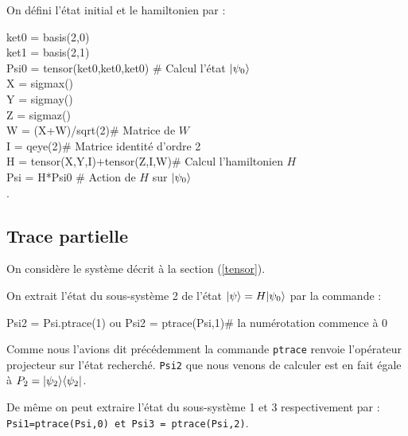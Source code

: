 On défini l'état initial et le hamiltonien par :\\
\begin{tt}
ket0 = basis(2,0)\\
ket1 = basis(2,1)\\
Psi0 = tensor(ket0,ket0,ket0) \# Calcul l'état $\vert\psi_0\rangle$\\
X = sigmax()\\
Y = sigmay()\\
Z = sigmaz()\\
W = (X+W)/sqrt(2)\# Matrice de $W$\\
I = qeye(2)\# Matrice identité d'ordre 2\\
H = tensor(X,Y,I)+tensor(Z,I,W)\# Calcul l'hamiltonien $H$\\
Psi = H*Psi0 \# Action de $H$ sur $\vert\psi_0\rangle$\\.
\end{tt}


\subsection{Trace partielle}

On considère le système décrit à la section (\ref{tensor}).

On extrait l'état du sous-système 2 de l'état $\vert\psi\rangle=H\vert\psi_0\rangle$ par la commande :\\
\begin{tt}
Psi2 = Psi.ptrace(1) ou Psi2 = ptrace(Psi,1)\# la numérotation commence à 0\\
\end{tt}
Comme nous l'avions dit précédemment la commande \texttt{ptrace} renvoie l'opérateur projecteur sur l'état recherché. \texttt{Psi2} que nous venons de calculer est en fait égale à $P_2=\vert\psi_2\rangle\langle\psi_2\vert$.

De même on peut extraire l'état du sous-système 1 et 3 respectivement par :\\ \texttt{Psi1=ptrace(Psi,0) et Psi3 = ptrace(Psi,2)}.

